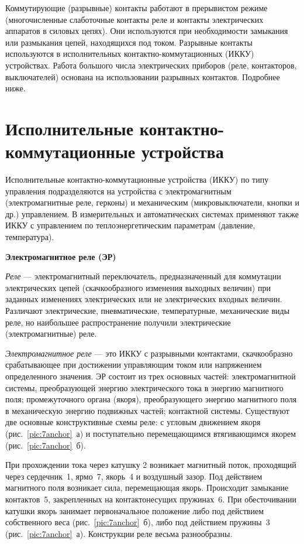 Коммутирующие (разрывные) контакты работают в прерывистом режиме (многочисленные слаботочные контакты реле и контакты электрических аппаратов в силовых цепях). Они используются при необходимости замыкания или размыкания цепей, находящихся под током. Разрывные контакты используются в исполнительных контактно-коммутационных (ИККУ) устройствах. Работа большого числа электрических приборов (реле, контакторов, выключателей) основана на использовании разрывных контактов. Подробнее ниже.

\section{Исполнительные контактно-коммутационные устройства}

Исполнительные контактно-коммутационные устройства (ИККУ) по типу управления подразделяются на устройства с электромагнитным (электромагнитные реле, герконы) и механическим (микровыключатели, кнопки и др.) управлением. В измерительных и автоматических системах применяют также ИККУ с управлением по теплоэнергетическим параметрам (давление, температура).

\begin{flushleft}
\textbf{Электромагнитное реле (ЭР)}
\end{flushleft}

\textit{Реле} --- электромагнитный переключатель, предназначенный для коммутации электрических цепей (скачкообразного изменения выходных величин) при заданных изменениях электрических или не электрических входных величин. Различают электрические, пневматические, температурные, механические виды реле, но наибольшее распространение получили электрические (электромагнитные) реле.

\textit{Электромагнитное реле} --- это ИККУ с разрывными контактами, скачкообразно срабатывающее при достижении управляющим током или напряжением определенного значения. ЭР состоит из трех основных частей: электромагнитной системы, преобразующей энергию электрического тока в энергию магнитного поля; промежуточного органа (якоря), преобразующего энергию магнитного поля в механическую энергию подвижных частей; контактной системы. Существуют две основные конструктивные схемы реле: с угловым движением якоря (рис.~\ref{pic:7anchor}~а) и поступательно перемещающимся втягивающимся якорем (рис.~\ref{pic:7anchor}~б). 

При прохождении тока через катушку 2 возникает магнитный поток, проходящий через сердечник~1, ярмо~7, якорь~4 и воздушный зазор. Под действием магнитного поля возникает сила, перемещающая якорь. Происходит замыкание контактов~5, закрепленных на контактонесущих пружинах~6. При обесточивании катушки якорь занимает первоначальное положение либо под действием собственного веса (рис.~\ref{pic:7anchor}~б), либо под действием пружины~3 (рис.~\ref{pic:7anchor}~а). Конструкции реле весьма разнообразны. 

